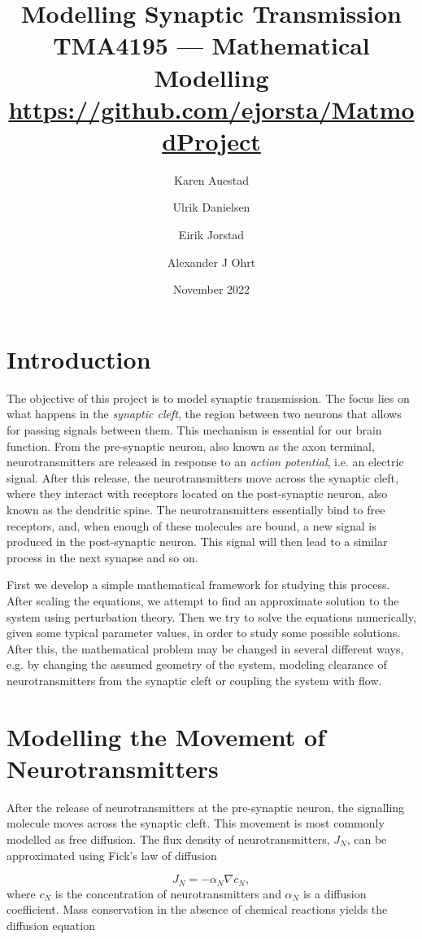 \documentclass{article}
\title{Modelling Synaptic Transmission \\
\large TMA4195 — Mathematical Modelling \\
\small \href{https://github.com/ejorsta/MatmodProject}{https://github.com/ejorsta/MatmodProject}}
\author{Karen Auestad \and Ulrik Danielsen \and Eirik Jorstad \and Alexander J Ohrt}
\date{November 2022}
\begin{document}
\maketitle

\section{Introduction}\label{Section:Intro}
The objective of this project is to model synaptic transmission. The focus lies on what happens in the \textit{synaptic cleft}, the region between two neurons that allows for passing signals between them. This mechanism is essential for our brain function. From the pre-synaptic neuron, also known as the axon terminal, neurotransmitters are released in response to an \textit{action potential}, i.e. an electric signal. After this release, the neurotransmitters move across the synaptic cleft, where they interact with receptors located on the post-synaptic neuron, also known as the dendritic spine. The neurotransmitters essentially bind to free receptors, and, when enough of these molecules are bound, a new signal is produced in the post-synaptic neuron. This signal will then lead to a similar process in the next synapse and so on. 

First we develop a simple mathematical framework for studying this process. After scaling the equations, we attempt to find an approximate solution to the system using perturbation theory. Then we try to solve the equations numerically, given some typical parameter values, in order to study some possible solutions. After this, the mathematical problem may be changed in several different ways, e.g. by changing the assumed geometry of the system, modeling clearance of neurotransmitters from the synaptic cleft or coupling the system with flow. 


\section{Modelling the Movement of Neurotransmitters}\label{Section:Diffusion}
After the release of neurotransmitters at the pre-synaptic neuron, the signalling molecule moves across the synaptic cleft. This movement is most commonly modelled as free diffusion. The flux density of neurotransmitters, $J_N$, can be approximated using Fick's law of diffusion

\begin{equation}
    J_N = -\alpha_N\nabla c_N,
    \label{Eq: Ficks Law}
\end{equation}
where $c_N$ is the concentration of neurotransmitters and $\alpha_N$ is a diffusion coefficient. Mass conservation in the absence of chemical reactions yields the diffusion equation 
\end{document}

